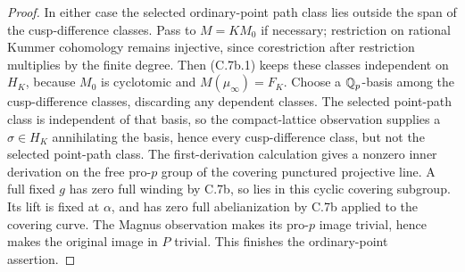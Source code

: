 \begin{proof}
In either case the selected ordinary-point path class lies outside the
span of the cusp-difference classes. Pass to $M=KM_0$ if necessary;
restriction on rational Kummer cohomology remains injective, since
corestriction after restriction multiplies by the finite degree. Then
(C.7b.1) keeps these classes independent on $H_K$, because $M_0$ is
cyclotomic and $M(\mu_\infty)=F_K$. Choose a $\mathbb Q_p$-basis among the cusp-difference classes, discarding
any dependent classes. The selected point-path class is independent of
that basis, so the compact-lattice observation supplies a $\sigma\in H_K$
annihilating the basis, hence every cusp-difference class, but not the
selected point-path class. The
first-derivation calculation gives a nonzero inner derivation on the
free pro-$p$ group of the covering punctured projective line.
A full fixed $g$ has zero full winding by C.7b, so lies in this cyclic
covering subgroup. Its lift is fixed at $\alpha$, and has zero full
abelianization by C.7b applied to the covering curve. The Magnus
observation makes its pro-$p$ image trivial, hence makes the original
image in $P$ trivial. This finishes the ordinary-point assertion.


\end{proof}
